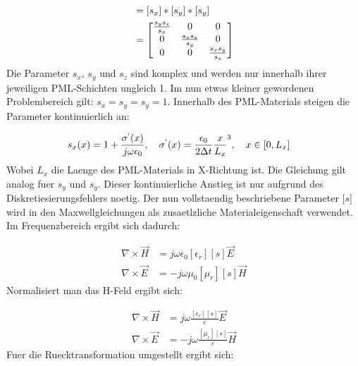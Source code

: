 \documentclass[11pt, ngerman]{article}
\begin{document}
\begin{align}
	[s] &= [s_x] * [s_y] * [s_y]\\
	&=\dt{\frac{s_y s_z}{s_x}}{\frac{s_x s_z}{s_y}}{\frac{s_x s_y}{s_z}}
\end{align}
Die Parameter \(s_x\), \(s_y\) und \(s_z\) sind komplex und werden nur innerhalb ihrer jeweiligen PML-Schichten ungleich 1.
Im nun etwas kleiner gewordenen Problembereich gilt: \(s_x = s_y = s_y = 1\).
Innerhalb des PML-Materials steigen die Parameter kontinuierlich an:

\begin{align}
	s_x(x) &= 1 + \frac{\sigma^`(x)}{j\omega\epsilon_0},\quad\sigma^`(x) = \frac{\epsilon_0}{2\Delta t}\frac{x}{L_x}^3,\quad x \in [0, L_x]
\end{align}
Wobei \(L_x\) die Laenge des PML-Materials in X-Richtung ist. Die Gleichung gilt analog fuer \(s_y\) und \(s_y\).
Dieser kontinuierliche Anstieg ist nur aufgrund des Diskretiesierungsfehlers noetig.
Der nun vollstaendig beschriebene Parameter \([s\)] wird in den Maxwellgleichungen als
zusaetlzliche Materialeigenschaft verwendet. Im Frequenzbereich ergibt sich dadurch:

\begin{align}
	\nabla\times\vec{H} &=  j\omega\epsilon_0[\epsilon_r][s]\vec{E}\\
	\nabla\times\vec{E} &= -j\omega\mu_0[\mu_r][s]\vec{H}
\end{align}
Normalisiert man das H-Feld ergibt sich:

\begin{align}
	\nabla\times\vec{H} &= j\omega\frac{[\epsilon_r][s]}{c}\vec{E}\\
	\nabla\times\vec{E} &= -j\omega\frac{[\mu_r][s]}{c}\vec{H}
\end{align}
Fuer die Ruecktransformation umgestellt ergibt sich:
\end{document}
